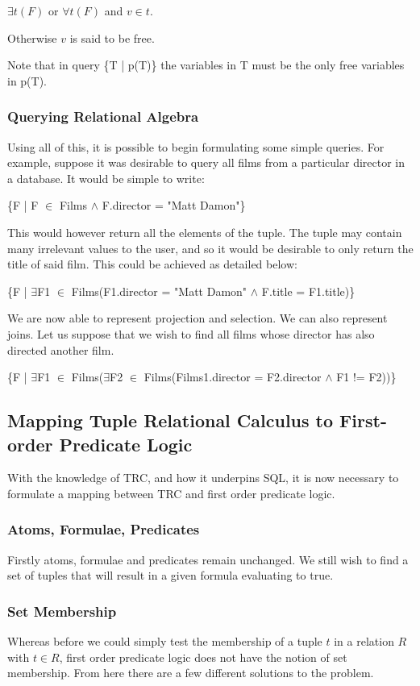 \documentclass[a4paper, 11pt]{article}
\begin{document}
      $\exists t(F)$ or $\forall t(F)$ and $v \in t$.

      Otherwise $v$ is said to be free.
      
      Note that in query \{T | p(T)\} the variables in T must be the only free variables in p(T).

    \subsubsection{Querying Relational Algebra}
      Using all of this, it is possible to begin formulating some simple
      queries. For example, suppose it was desirable to query all films from a
      particular director in a database. It would be simple to write:

      \{F | F $\in$ Films $\land$ F.director = "Matt Damon"\}

      This would however return all the elements of the tuple. The tuple may
      contain many irrelevant values to the user, and so it would be desirable
      to only return the title of said film. This could be achieved as detailed
      below:

      \{F | $\exists$F1 $\in$ Films(F1.director = "Matt Damon" $\land$ F.title =
      F1.title)\}

      We are now able to represent projection and selection. We can also
      represent joins. Let us suppose that we wish to find all films whose
      director has also directed another film.

      \{F | $\exists$F1 $\in$ Films($\exists$F2 $\in$ Films(Films1.director =
      F2.director $\land$ F1 != F2))\}

\subsection{Mapping Tuple Relational Calculus to First-order Predicate Logic}
    With the knowledge of TRC, and how it underpins SQL, it is now necessary to
    formulate a mapping between TRC and first order predicate logic.

    \subsubsection{Atoms, Formulae, Predicates}
      Firstly atoms, formulae and predicates remain unchanged. We still wish to
      find a set of tuples that will result in a given formula evaluating to
      true.

    \subsubsection{Set Membership}
      Whereas before we could simply test the membership of a tuple $t$ in a
      relation $R$ with $t \in R$, first order predicate logic does not have
      the notion of set membership. From here there are a few different
      solutions to the problem.
\end{document}

